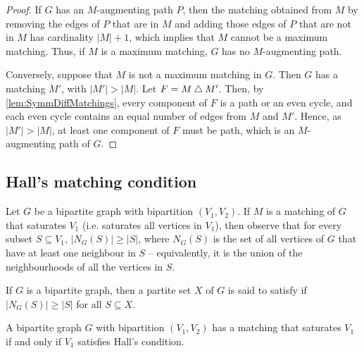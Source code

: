 \begin{proof}
If $G$ has an $M$-augmenting path $P$, then the matching obtained from $M$ by removing the edges of $P$ that are in $M$ and adding those edges of $P$ that are not in $M$ has cardinality $|M| + 1$, which implies that $M$ cannot be a maximum matching. Thus, if $M$ is a maximum matching, $G$ has no $M$-augmenting path.

Conversely, suppose that $M$ is not a maximum matching in $G$. Then $G$ has a matching $M'$, with $|M'| > |M|$. Let $F = M \mathbin{\triangle} M'$. Then, by \cref{lem:SymmDiffMatchings}, every component of $F$ is a path or an even cycle, and each even cycle contains an equal number of edges from $M$ and $M'$. Hence, as $|M'| > |M|$, at least one component of $F$ must be path, which is an $M$-augmenting path of $G$.
\end{proof}

\subsection*{Hall's matching condition}\label{subsec:Hall}
Let $G$ be a bipartite graph with bipartition $(V_1, V_2)$. If $M$ is a matching of $G$ that saturates $V_1$ (i.e. saturates all vertices in $V_1$), then observe that for every subset $S \subseteq V_1$, $|N_G(S)| \ge |S|$, where $N_G(S)$ is the set of all vertices of $G$ that have at least one neighbour in $S$ -- equivalently, it is the union of the neighbourhoods of all the vertices in $S$.

If $G$ is a bipartite graph, then a partite set $X$ of $G$ is said to satisfy  if $|N_G(S)| \ge |S|$ for all $S \subseteq X$.

\begin{Theorem}\label{thm:Hall}
A bipartite graph $G$ with bipartition $(V_1, V_2)$ has a matching that saturates $V_1$ if and only if $V_1$ satisfies Hall's condition.
\end{Theorem}


